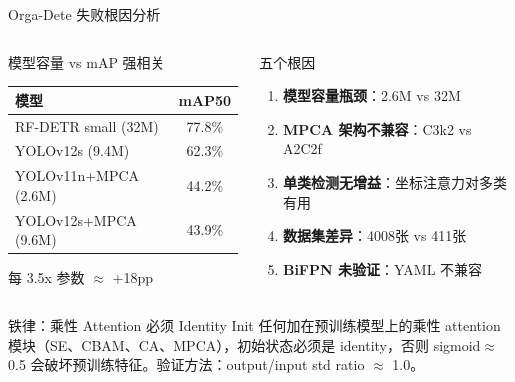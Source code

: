 \documentclass[aspectratio=169, 10pt]{beamer}
\begin{document}
\begin{frame}{Orga-Dete 失败根因分析}
  \begin{columns}[T]
    \begin{block}{模型容量 vs mAP 强相关}
      \begin{tabular}{lc}
        \toprule
        模型 & mAP50 \\
        \midrule
        RF-DETR small (32M) & 77.8\% \\
        YOLOv12s (9.4M) & 62.3\% \\
        YOLOv11n+MPCA (2.6M) & 44.2\% \\
        YOLOv12s+MPCA (9.6M) & 43.9\% \\
        \bottomrule
      \end{tabular}
      \vspace{0.3em}
      
      每 3.5x 参数 $\approx$ +18pp
    \end{block}
    \begin{block}{五个根因}
      \begin{enumerate}
        \item \textbf{模型容量瓶颈}：2.6M vs 32M
        \item \textbf{MPCA 架构不兼容}：C3k2 vs A2C2f
        \item \textbf{单类检测无增益}：坐标注意力对多类有用
        \item \textbf{数据集差异}：4008张 vs 411张
        \item \textbf{BiFPN 未验证}：YAML 不兼容
      \end{enumerate}
    \end{block}
  \end{columns}
  \vspace{0em}
  \begin{alertblock}{铁律：乘性 Attention 必须 Identity Init}
    任何加在预训练模型上的乘性 attention 模块（SE、CBAM、CA、MPCA），初始状态必须是 identity，否则 sigmoid$\approx$0.5 会破坏预训练特征。验证方法：output/input std ratio $\approx$ 1.0。
  \end{alertblock}
\end{frame}
\end{document}
